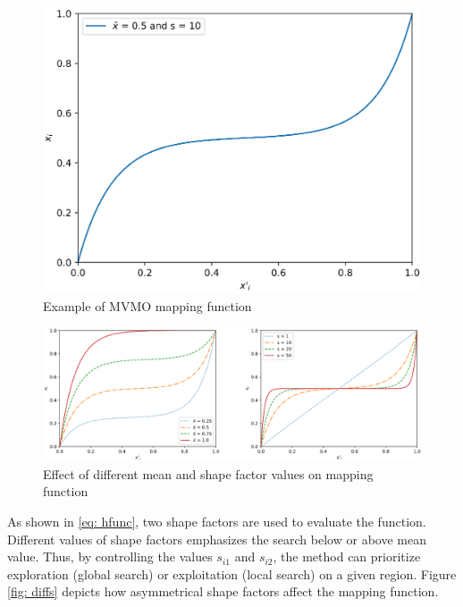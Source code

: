 \begin{figure}[!h]
	\caption{Example of MVMO mapping function}
	\begin{center}
		\includegraphics[scale=.5]{Images/MVMOTransformation.eps}
	\end{center}
	\label{fig: mappingf}
\end{figure}

\begin{figure}[h]
	\caption{Effect of different mean and shape factor values on mapping function}
	\begin{center}
		\includegraphics[scale=.5]{Images/mean_var_effects.eps}
	\end{center}
	\label{fig: mapeffects}
\end{figure}

As shown in \eqref{eq: hfunc}, two shape factors are used to evaluate the function. Different values of shape factors emphasizes the search below or above mean value. Thus, by controlling the values $s_{i1}$ and $s_{i2}$, the method can prioritize exploration (global search) or exploitation (local search) on a given region. Figure \ref{fig: diffs} depicts how asymmetrical shape factors affect the mapping function.

